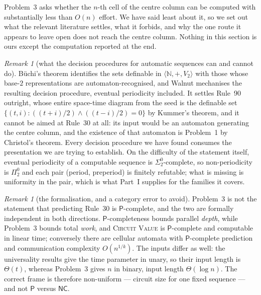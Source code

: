 \documentclass[11pt]{article}
\theoremstyle{definition}
\theoremstyle{remark}
\newtheorem{remark}[theorem]{Remark}
\newcommand{\N}{\mathbb{N}}
\begin{document}
Problem~3 asks whether the $n$-th cell of the centre column can be computed with substantially less
than $O(n)$ effort. We have said least about it, so we set out what the relevant literature settles,
what it forbids, and why the one route it appears to leave open does not reach the centre column. Nothing in this section is ours except the
computation reported at the end.

\begin{remark}[what the decision procedures for automatic sequences can and cannot do]\label{p3:walnut}
B\"uchi's theorem identifies the sets definable in $\langle\N,+,V_2\rangle$ with those whose base-$2$
representations are automaton-recognised, and Walnut \cite{Walnut} mechanises the resulting decision procedure,
eventual periodicity included. It settles Rule~90 outright, whose entire space-time diagram from the
seed is the definable set $\{(t,i):((t+i)/2)\wedge((t-i)/2)=0\}$ by Kummer's theorem, and it cannot be
aimed at Rule~30 at all: its input would be an automaton generating the centre column, and the
existence of that automaton is Problem~1 by Christol's theorem. Every decision procedure we have found
consumes the presentation we are trying to establish. On the difficulty of the statement itself,
eventual periodicity of a computable sequence is $\Sigma^0_2$-complete, so non-periodicity is
$\Pi^0_2$ and each pair (period, preperiod) is finitely refutable; what is missing is uniformity in the
pair, which is what Part~I supplies for the families it covers.
\end{remark}

\begin{remark}[the formalisation, and a category error to avoid]\label{p3:form}
Problem~3 is not the statement that predicting Rule~30 is $\mathsf{P}$-complete, and the two are
formally independent in both directions. $\mathsf{P}$-completeness bounds parallel \emph{depth}, while
Problem~3 bounds total \emph{work}, and \textsc{Circuit Value} is $\mathsf{P}$-complete and computable
in linear time; conversely there are cellular automata with $\mathsf{P}$-complete prediction and
communication complexity $O(n^{1/k})$. The inputs differ as well: the universality results give the
time parameter in unary, so their input length is $\Theta(t)$, whereas Problem~3 gives $n$ in binary,
input length $\Theta(\log n)$. The correct frame is therefore non-uniform --- circuit size for one
fixed sequence --- and not $\mathsf{P}$ versus $\mathsf{NC}$.
\end{remark}
\end{document}
